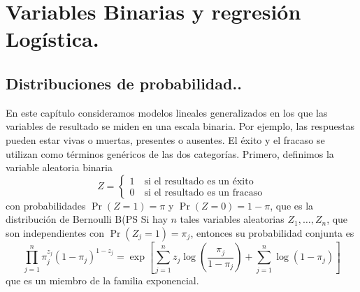 \documentclass[
]{book}
\begin{document}
\hypertarget{variables-binarias-y-regresiuxf3n-loguxedstica.}{%
\chapter{Variables Binarias y regresión Logística.}\label{variables-binarias-y-regresiuxf3n-loguxedstica.}}

\hypertarget{distribuciones-de-probabilidad..}{%
\section{Distribuciones de probabilidad..}\label{distribuciones-de-probabilidad..}}

En este capítulo consideramos modelos lineales generalizados en los que las variables de resultado se miden en una escala binaria. Por ejemplo, las respuestas pueden estar vivas o muertas, presentes o ausentes. El éxito y el fracaso se utilizan como términos genéricos de las dos categorías. Primero, definimos la variable aleatoria binaria
\[
Z = \left\{\begin{array}{l}
1 \quad \text{si el resultado es un éxito} \\
0 \quad \text{si el resultado es un fracaso}
\end{array}\right.
\]
con probabilidades \(\operatorname{Pr}(Z=1) =\pi\) y \(\operatorname{Pr}(Z=0) = 1-\pi\), que es la distribución de Bernoulli \(\mathrm{B}\)(\pi PS Si hay \(n\) tales variables aleatorias \(Z_{1}, \ldots,Z_{n}\), que son independientes con \(\operatorname{Pr}\left(Z_{j} =1\right) = \pi_{j}\), entonces su probabilidad conjunta es
\begin{equation}
\prod_{j=1}^{n} \pi_{j}^{z_{j}}\left(1-\pi_{j} \right)^{1-z_{j}} = \exp\left[\sum_{j=1}^{n}z_{j}\log\left(\frac{\pi_{j}} {1- \pi_{j}} \right) + \sum_{j=1}^{n} \log\left(1-\pi_{j}\right)\right]
\end{equation}
que es un miembro de la familia exponencial.
\end{document}
